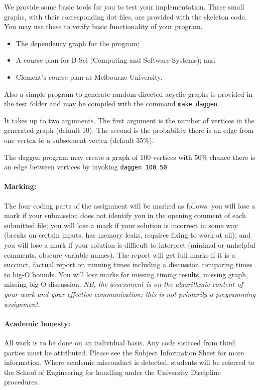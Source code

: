 \documentclass[11pt]{article}
\begin{document}
We provide some basic tools for you to test your implementation.
Three small graphs, with their corresponding dot files, are provided with the skeleton code.
You may use these to verify basic functionality of your program.

\begin{itemize}
    \item The dependency graph for the program;
    \item A course plan for B-Sci (Computing and Software Systems); and
    \item Clement's course plan at Melbourne University.
\end{itemize}

Also a simple program to generate random directed acyclic graphs is provided in the test folder and may
be compiled with the command \texttt{make daggen}.

It takes up to two arguments. The first argument is the number of vertices in the generated graph (default 10).
The second is the probability there is an edge from one vertex to a subsequent vertex (default 35\%).

The daggen program may create a graph of 100 vertices with 50\% chance there is an edge between vertices by invoking \texttt{daggen 100 50}

\paragraph{Marking:}
The four coding parts of the assignment will be marked as follows:
you will lose a mark if your submission does not identify you in the opening comment of each submitted file;
you will lose a mark if your solution is incorrect in some way (breaks on certain inputs, has memory leaks, requires fixing to work at all);
and you will lose a mark if your solution is difficult to interpret (minimal or unhelpful comments, obscure variable names).
The report will get full marks if it is a succinct, factual report on running times including a discussion comparing times to big-O bounds.
You will lose marks for missing timing results, missing graph, missing big-O discussion.
\emph{NB, the assessment is on the algorithmic content of your work and your effective communication; this is not primarily a programming assignment.}

\paragraph{Academic honesty:}
All work is to be done on an individual basis.
Any code sourced from third parties must be attributed.
Please see the Subject Information Sheet for more information.
Where academic misconduct is detected, students will be
referred to the School of Engineering for handling under the University
Discipline procedures.
\end{document}
